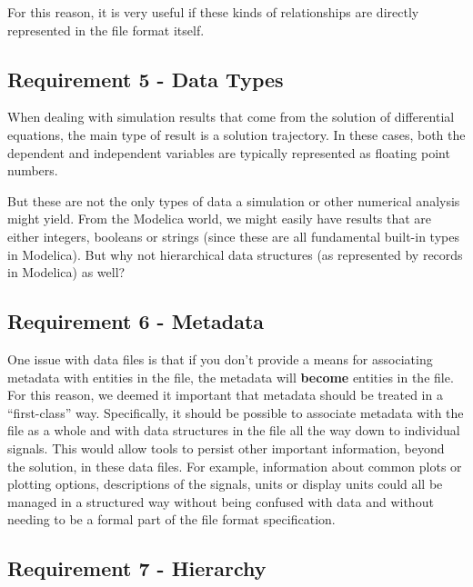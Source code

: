 \documentclass[11pt,a4paper,twocolumn]{article}
\begin{document}
For this reason, it is very useful if these kinds of relationships are
directly represented in the file format itself.

\subsection{Requirement 5 - Data Types}


When dealing with simulation results that come from the solution of
differential equations, the main type of result is a solution
trajectory.  In these cases, both the dependent and independent
variables are typically represented as floating point numbers.

But these are not the only types of data a simulation or other
numerical analysis might yield.  From the Modelica world, we might
easily have results that are either integers, booleans or strings
(since these are all fundamental built-in types in Modelica).  But why
not hierarchical data structures (as represented by records in
Modelica) as well?

\subsection{Requirement 6 - Metadata}


One issue with data files is that if you don't provide a means for
associating metadata with entities in the file, the metadata will
\textbf{become} entities in the file.  For this reason, we deemed it
important that metadata should be treated in a ``first-class'' way.
Specifically, it should be possible to associate metadata with the
file as a whole and with data structures in the file all the way down
to individual signals.  This would allow tools to persist other
important information, beyond the solution, in these data files.  For
example, information about common plots or plotting options,
descriptions of the signals, units or display units could all be
managed in a structured way without being confused with data and
without needing to be a formal part of the file format specification.

\subsection{Requirement 7 - Hierarchy}
\end{document}
